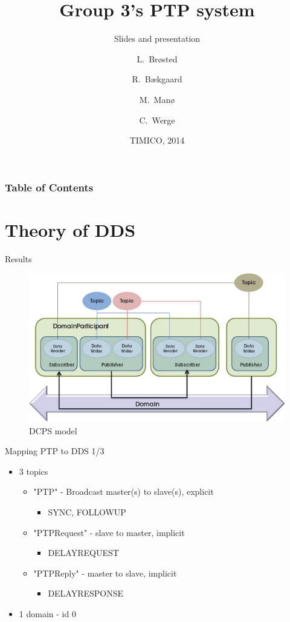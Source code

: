 \documentclass[compressed, presentation, notheorems, 12pt]{beamer}
\title{Group 3's PTP system}
\subtitle{Slides and presentation}
\author[Author, Anders] %
{L.~Brøsted \and R.~Bækgaard \and M.~Manø \and C.~Werge}
\institute
{
  Aarhus University \\
  School of Engineering
}
\date{TIMICO, 2014}
\begin{document}
 	\frame{\titlepage}

\begin{frame}
\frametitle{Table of Contents}
\tableofcontents%
\end{frame}

\section{Theory of DDS}

\begin{frame}{Results}

\begin{figure}[hbtp]
\centering
\includegraphics[width =0.9 \textwidth]{RTI_EntityOverview_small}
\caption{DCPS model}
\end{figure}


\end{frame}


\begin{frame}{Mapping PTP to DDS 1/3}
\begin{itemize}
	\item 3 topics
	\begin{itemize}
		\item "PTP" - Broadcast master(s) to slave(s), explicit
		\begin{itemize}
			\item SYNC, FOLLOWUP
		\end{itemize}
		\item "PTPRequest" - slave to master, implicit
		\begin{itemize}
			\item DELAYREQUEST
		\end{itemize}
		\item "PTPReply" - master to slave, implicit
		\begin{itemize}
		 	\item DELAYRESPONSE
		 \end{itemize} 
	\end{itemize}

	\item  1 domain - id 0
\end{itemize}
\end{frame}
\end{document}
